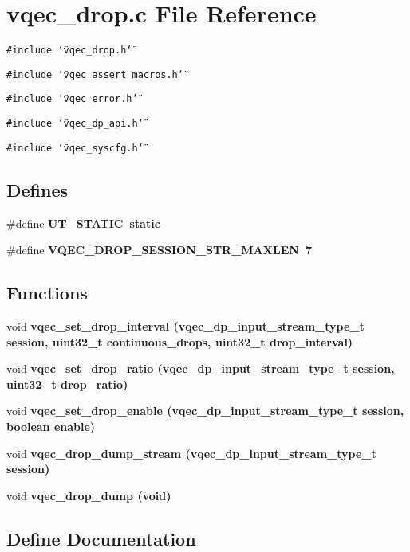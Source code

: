 \section{vqec\_\-drop.c File Reference}
\label{vqec__drop_8c}
{\tt \#include \char`\"{}vqec\_\-drop.h\char`\"{}}\par
{\tt \#include \char`\"{}vqec\_\-assert\_\-macros.h\char`\"{}}\par
{\tt \#include \char`\"{}vqec\_\-error.h\char`\"{}}\par
{\tt \#include \char`\"{}vqec\_\-dp\_\-api.h\char`\"{}}\par
{\tt \#include \char`\"{}vqec\_\-syscfg.h\char`\"{}}\par
\subsection*{Defines}
\begin{CompactItemize}
\item 
\#define \bf{UT\_\-STATIC}~static
\item 
\#define \bf{VQEC\_\-DROP\_\-SESSION\_\-STR\_\-MAXLEN}~7
\end{CompactItemize}
\subsection*{Functions}
\begin{CompactItemize}
\item 
void \bf{vqec\_\-set\_\-drop\_\-interval} (vqec\_\-dp\_\-input\_\-stream\_\-type\_\-t session, uint32\_\-t continuous\_\-drops, uint32\_\-t drop\_\-interval)
\item 
void \bf{vqec\_\-set\_\-drop\_\-ratio} (vqec\_\-dp\_\-input\_\-stream\_\-type\_\-t session, uint32\_\-t drop\_\-ratio)
\item 
void \bf{vqec\_\-set\_\-drop\_\-enable} (vqec\_\-dp\_\-input\_\-stream\_\-type\_\-t session, boolean enable)
\item 
void \bf{vqec\_\-drop\_\-dump\_\-stream} (vqec\_\-dp\_\-input\_\-stream\_\-type\_\-t session)
\item 
void \bf{vqec\_\-drop\_\-dump} (void)
\end{CompactItemize}


\subsection{Define Documentation}
